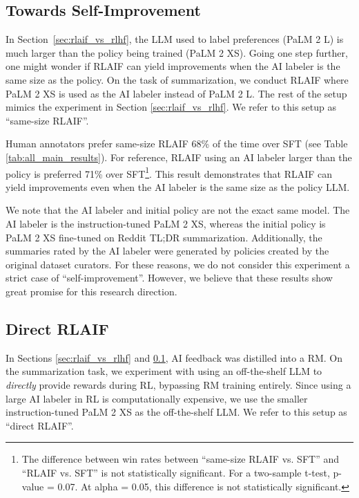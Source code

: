 \documentclass[11pt]{article}
\begin{document}
\subsection{Towards Self-Improvement}
\label{sec:towards-self-improvement}

In Section~\ref{sec:rlaif_vs_rlhf}, the LLM used to label preferences (PaLM 2 L) is much larger than the policy being trained (PaLM 2 XS). Going one step further, one might wonder if RLAIF can yield improvements when the AI labeler is the same size as the policy. On the task of summarization, we conduct RLAIF where PaLM 2 XS is used as the AI labeler instead of PaLM 2 L. The rest of the setup mimics the experiment in Section \ref{sec:rlaif_vs_rlhf}. We refer to this setup as ``same-size RLAIF''.

Human annotators prefer same-size RLAIF 68\% of the time over SFT (see Table \ref{tab:all_main_results}). For reference, RLAIF using an AI labeler larger than the policy is preferred 71\% over SFT\footnote{The difference between win rates between ``same-size RLAIF vs. SFT'' and ``RLAIF vs. SFT'' is not statistically significant. For a two-sample t-test, p-value = 0.07. At alpha = 0.05, this difference is not statistically significant.}.  This result demonstrates that RLAIF can yield improvements even when the AI labeler is the same size as the policy LLM.

We note that the AI labeler and initial policy are not the exact same model. The AI labeler is the instruction-tuned PaLM 2 XS, whereas the initial policy is PaLM 2 XS fine-tuned on Reddit TL;DR summarization. Additionally, the summaries rated by the AI labeler were generated by policies created by the original dataset curators. For these reasons, we do not consider this experiment a strict case of ``self-improvement''\citep{huang2022large}. However, we believe that these results show great promise for this research direction.

\subsection{Direct RLAIF}
\label{sec:direct-rlaif}
In Sections \ref{sec:rlaif_vs_rlhf} and \ref{sec:towards-self-improvement}, AI feedback was distilled into a RM. On the summarization task, we experiment with using an off-the-shelf LLM to \textit{directly} provide rewards during RL, bypassing RM training entirely. Since using a large AI labeler in RL is computationally expensive, we use the smaller instruction-tuned PaLM 2 XS as the off-the-shelf LLM. We refer to this setup as ``direct RLAIF''.
\end{document}
